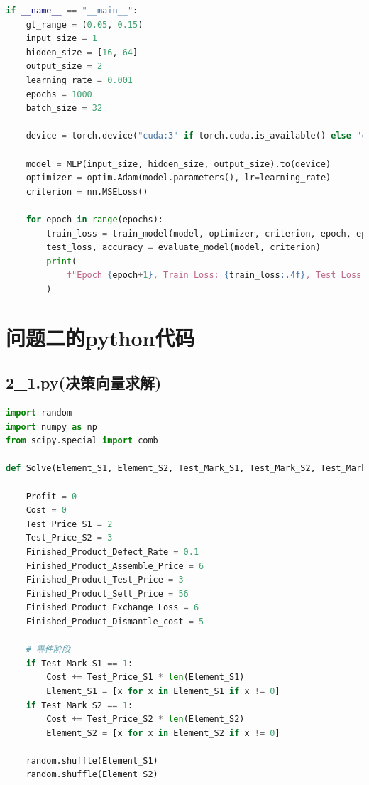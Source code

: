 \documentclass[withoutpreface,bwprint]{cumcmthesis} %
\begin{document}
\begin{appendices}
\begin{lstlisting}[language=python]
if __name__ == "__main__":
    gt_range = (0.05, 0.15)
    input_size = 1
    hidden_size = [16, 64]
    output_size = 2
    learning_rate = 0.001
    epochs = 1000
    batch_size = 32

    device = torch.device("cuda:3" if torch.cuda.is_available() else "cpu")

    model = MLP(input_size, hidden_size, output_size).to(device)
    optimizer = optim.Adam(model.parameters(), lr=learning_rate)
    criterion = nn.MSELoss()

    for epoch in range(epochs):
        train_loss = train_model(model, optimizer, criterion, epoch, epochs)
        test_loss, accuracy = evaluate_model(model, criterion)
        print(
            f"Epoch {epoch+1}, Train Loss: {train_loss:.4f}, Test Loss: {test_loss:.4f}, Accuracy: {accuracy:.4f}"
        )

	\end{lstlisting}
\section{问题二的python代码}
\subsection{2\_1.py(决策向量求解)}
\begin{lstlisting}[language=python]
	import random
import numpy as np
from scipy.special import comb

def Solve(Element_S1, Element_S2, Test_Mark_S1, Test_Mark_S2, Test_Mark_Finished_Product, Dismantle_Mark_Finished_Product, Exchange_Quantity):

    Profit = 0
    Cost = 0
    Test_Price_S1 = 2
    Test_Price_S2 = 3
    Finished_Product_Defect_Rate = 0.1
    Finished_Product_Assemble_Price = 6
    Finished_Product_Test_Price = 3
    Finished_Product_Sell_Price = 56
    Finished_Product_Exchange_Loss = 6
    Finished_Product_Dismantle_cost = 5

    # 零件阶段
    if Test_Mark_S1 == 1:
        Cost += Test_Price_S1 * len(Element_S1)
        Element_S1 = [x for x in Element_S1 if x != 0]
    if Test_Mark_S2 == 1:
        Cost += Test_Price_S2 * len(Element_S2)
        Element_S2 = [x for x in Element_S2 if x != 0]

    random.shuffle(Element_S1)
    random.shuffle(Element_S2)


\end{lstlisting}
\end{appendices}
\end{document}
